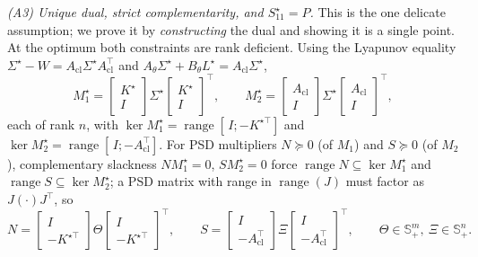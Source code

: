\documentclass[twocolumn,amsthm]{autart}
\begin{document}
\emph{(A3) Unique dual, strict complementarity, and $S_{11}^\star=P$.} This is the
one delicate assumption; we prove it by \emph{constructing} the dual and showing it
is a single point. At the optimum both constraints are rank deficient. Using the
Lyapunov equality $\Sigma^\star-W=A_{\mathrm{cl}}\Sigma^\star A_{\mathrm{cl}}^\top$
and $A_\theta\Sigma^\star+B_\theta L^\star=A_{\mathrm{cl}}\Sigma^\star$,
\begin{equation}\label{eq:rank1}
M_1^\star=\begin{bmatrix}K^\star\\ I\end{bmatrix}\Sigma^\star
\begin{bmatrix}K^\star\\ I\end{bmatrix}^{\!\top}\!,\qquad
M_2^\star=\begin{bmatrix}A_{\mathrm{cl}}\\ I\end{bmatrix}\Sigma^\star
\begin{bmatrix}A_{\mathrm{cl}}\\ I\end{bmatrix}^{\!\top}\!,
\end{equation}
each of rank $n$, with $\ker M_1^\star=\operatorname{range}[\,I;-K^{\star\top}]$ and
$\ker M_2^\star=\operatorname{range}[\,I;-A_{\mathrm{cl}}^\top]$. For PSD multipliers
$N\succeq0$ (of $M_1$) and $S\succeq0$ (of $M_2$), complementary slackness
$NM_1^\star=0$, $SM_2^\star=0$ force $\operatorname{range}N\subseteq\ker M_1^\star$
and $\operatorname{range}S\subseteq\ker M_2^\star$; a PSD matrix with range in
$\operatorname{range}(J)$ must factor as $J(\cdot)J^\top$, so
\begin{equation}\label{eq:lift}
N=\begin{bmatrix}I\\ -K^{\star\top}\end{bmatrix}\Theta
\begin{bmatrix}I\\ -K^{\star\top}\end{bmatrix}^{\!\top}\!,\qquad
S=\begin{bmatrix}I\\ -A_{\mathrm{cl}}^\top\end{bmatrix}\Xi
\begin{bmatrix}I\\ -A_{\mathrm{cl}}^\top\end{bmatrix}^{\!\top}\!,\qquad
\Theta\in\mathbb S^m_+,\ \Xi\in\mathbb S^n_+ .
\end{equation}
\end{document}
